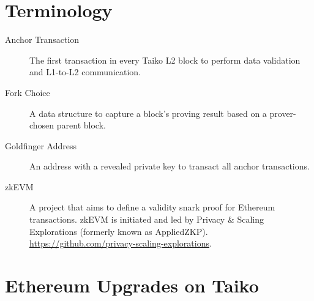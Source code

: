 \documentclass[9pt,oneside]{amsart}
\begin{document}
\section{Terminology} \label{ch:Terminology}

\begin{description}
\item[Anchor Transaction] The first transaction in every Taiko L2 block to perform data validation and L1-to-L2 communication.


\item[Fork Choice] A data structure to capture a block's proving result based on a prover-chosen parent block.

\item[Goldfinger Address] An address with a revealed private key to transact all anchor transactions.

\item[zkEVM] A project that aims to define a validity snark proof for Ethereum transactions. zkEVM is initiated and led by 
Privacy & Scaling Explorations (formerly known as AppliedZKP). \\ 
\url{https://github.com/privacy-scaling-explorations}.
\end{description}


\section{Ethereum Upgrades on Taiko}\label{sec:eips}
\end{document}
